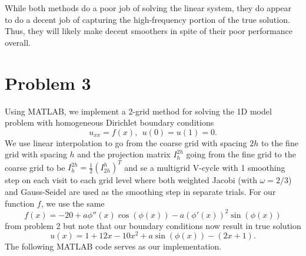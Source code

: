 \documentclass{article}
\begin{document}
While both methods do a poor job of solving the linear system, they do appear to do a decent job of capturing the high-frequency portion of the true solution. Thus, they will likely make decent smoothers in spite of their poor performance overall.


\section{Problem 3}
Using MATLAB, we implement a 2-grid method for solving the 1D model problem with homogeneous Dirichlet
boundary conditions
\[
u_{xx} = f(x) ,~~u(0) = u(1) = 0.
\]
We use linear interpolation to go from the coarse grid with spacing $2h$ to the fine grid
with spacing $h$ and the projection matrix $I_h^{2h}$ going from the fine grid to the
coarse grid to be 
$I_h^{2h} = \frac{1}{2} ( I_{2h}^h )^T$ and se a multigrid V-cycle with 1 smoothing step on each visit to each grid level where both weighted Jacobi (with $\omega=2/3$) and Gauss-Seidel are used as the smoothing step in separate trials. For our function $f$, we use the same 
\[
f(x) = -20 + a \phi'' (x) \cos( \phi (x)) - a ( \phi' (x) )^2 \sin ( \phi (x) )
\]
from problem 2 but note that our boundary conditions now result in true solution
\[
u(x) = 1 + 12 x - 10 x^2 + a \sin ( \phi (x) ) -(2x+1).
\]
The following MATLAB code serves as our implementation.
\end{document}
